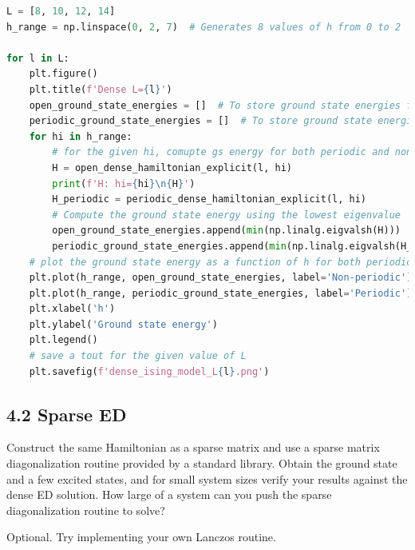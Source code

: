 \documentclass[12pt]{article}
\begin{document}
\begin{lstlisting}[language=Python]
L = [8, 10, 12, 14]
h_range = np.linspace(0, 2, 7)  # Generates 8 values of h from 0 to 2

for l in L:
    plt.figure()
    plt.title(f'Dense L={l}')
    open_ground_state_energies = []  # To store ground state energies for different h
    periodic_ground_state_energies = []  # To store ground state energies for different h
    for hi in h_range:
        # for the given hi, comupte gs energy for both periodic and non-periodic
        H = open_dense_hamiltonian_explicit(l, hi)
        print(f'H: hi={hi}\n{H}')
        H_periodic = periodic_dense_hamiltonian_explicit(l, hi)
        # Compute the ground state energy using the lowest eigenvalue
        open_ground_state_energies.append(min(np.linalg.eigvalsh(H)))
        periodic_ground_state_energies.append(min(np.linalg.eigvalsh(H_periodic)))
    # plot the ground state energy as a function of h for both periodic and non-periodic
    plt.plot(h_range, open_ground_state_energies, label='Non-periodic')
    plt.plot(h_range, periodic_ground_state_energies, label='Periodic')
    plt.xlabel('h')
    plt.ylabel('Ground state energy')
    plt.legend()
    # save a tout for the given value of L
    plt.savefig(f'dense_ising_model_L{l}.png')
\end{lstlisting}



\subsection*{4.2 Sparse ED}
Construct the same Hamiltonian as a sparse matrix and use a sparse matrix diagonalization routine provided by a standard library. Obtain the ground state and a few excited states, and for small system sizes verify your results against the dense ED solution. How large of a system can you push the sparse diagonalization routine to solve?


Optional. Try implementing your own Lanczos routine.
\end{document}
